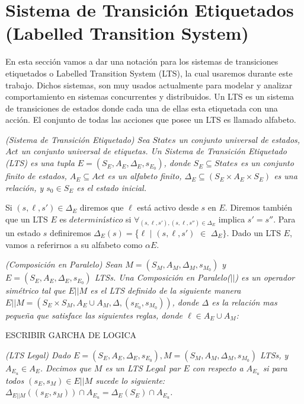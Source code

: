 \section{Sistema de Transición Etiquetados (Labelled Transition System)}

En esta sección vamos a dar una notación para los sistemas de transiciones etiquetados o Labelled Transition System
(LTS), la cual usaremos durante este trabajo. Dichos sistemas, son muy usados actualmente para modelar y analizar
comportamiento en sistemas concurrentes y distribuidos. Un LTS es un sistema de transiciones de estados donde cada una
de ellas esta etiquetada con una acción. El conjunto de todas las acciones que posee un LTS es llamado alfabeto.

\begin{nahaDef}
    \emph{(Sistema de Transición Etiquetado)\cite{Keller:1976:FVP:360248.360251} Sea $States$ un conjunto universal de estados, $Act$ un conjunto
    universal de etiquetas. Un Sistema de Transición Etiquetado (LTS) es una tupla $E = (S_E,A_E,\Delta_E,s_{E_0})$,
    donde $S_E \subseteq States$ es un conjunto finito de estados, $A_E \subseteq Act$ es un alfabeto finito, $\Delta_E
    \subseteq (S_E \times A_E \times S_E)$ es una relación, y $s_0 \in S_E$ es el estado inicial.}
\end{nahaDef}

Si $(s,\ell,s') \in \Delta_E$ diremos que $\ell$ está activo desde $s$ en $E$. Diremos también que un LTS $E$ es
$determinístico$ si $\forall_{(s,\ell,s'),(s,\ell,s'') \in \Delta_E}$ implica $s' = s''$. Para un estado $s$ definiremos
$\Delta_E(s) = $\{$\ell$ $|$ $(s,\ell,s')$ $\in$ $\Delta_E\}$. Dado un LTS $E$, vamos a referirnos a su alfabeto como $\alpha E$.

\begin{nahaDef}
    \emph{(Composición en Paralelo) Sean $M = (S_M,A_M,\Delta_M, s_{M_0})$ y $E = (S_E,A_E,\Delta_E, s_{E_0})$ LTSs.
    Una Composición en Paralelo($||$) es un operador simétrico tal que $E||M$ es el LTS definido de la siguiente
    manera $E||M = (S_E \times S_M, A_E \cup A_M, \Delta, (s_{E_0},s_{M_0}))$, donde $\Delta$ es la relación mas
    pequeña que satisface las siguientes reglas, donde $\ell \in A_E \cup A_M$:}
\end{nahaDef}

ESCRIBIR GARCHA DE LOGICA

\begin{nahaDef}
    \emph{(LTS Legal) Dado $E = (S_E, A_E, \Delta_E, s_{E_0}), M = (S_M, A_M, \Delta_M, s_{M_0})$ LTSs, y $A_{E_u} \in
    A_E$. Decimos que $M$ es un LTS $Legal$ par $E$ con respecto a $A_{E_u}$ si para todos $(s_E,s_M) \in E||M$ sucede
    lo siguiente: $\Delta_{E||M}((s_E,s_M)) \cap A_{E_u} = \Delta_E(S_E) \cap A_{E_u}$.}
\end{nahaDef} 

